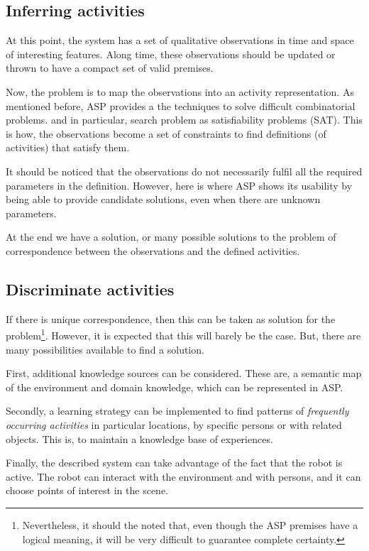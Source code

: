 \subsection{Inferring activities}

At this point, the system has a set of qualitative observations in time and space of interesting features.
Along time, these observations should be updated or thrown to have a compact set of valid premises.

Now, the problem is to map the observations into an activity representation. 
As mentioned before, ASP provides a the techniques to solve difficult combinatorial problems. and in particular, search problem as satisfiability problems (SAT).
This is how, the observations become a set of constraints to find definitions (of activities) that satisfy them.

It should be noticed that the observations do not necessarily fulfil all the required parameters in the definition.
However, here is where ASP shows its usability by being able to provide candidate solutions, even when there are unknown parameters.

At the end we have a solution, or many possible solutions to the problem of correspondence between the observations and the defined activities.



\subsection{Discriminate activities}

If there is unique correspondence, then this can be taken as solution for the problem\footnote{Nevertheless, it should the noted that, even though the ASP premises have a logical meaning, it will be very difficult to guarantee complete certainty.}. 
However, it is expected that this will barely be the case.
But, there are many possibilities available to find a solution.

First, additional knowledge sources can be considered.
These are, a semantic map of the environment and domain knowledge, which can be represented in ASP.

Secondly, a learning strategy can be implemented to find patterns of \textit{frequently occurring activities} in particular locations, by specific persons or with related objects. 
This is, to maintain a knowledge base of experiences.

Finally, the described system can take advantage of the fact that the robot is active.
The robot can interact with the environment and with persons, and it can choose points of interest in the scene.

